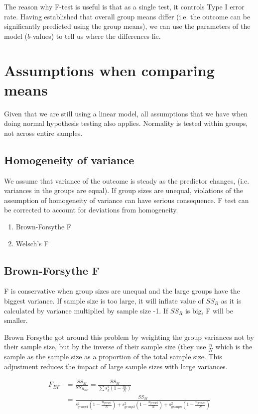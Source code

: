 The reason why F-test is useful is that as a single test, it controls Type I error rate. Having established that overall group means differ (i.e. the outcome can be significantly predicted using the group means), we can use the parameters of the model ($b$-values) to tell us where the differences lie. 

\section{Assumptions when comparing means}
Given that we are still using a linear model, all assumptions that we have when doing normal hypothesis testing also applies. Normality is tested within groups, not across entire samples. 
\subsection{Homogeneity of variance}
We assume that variance of the outcome is steady as the predictor changes, (i.e. variances in the groups are equal). 
If group sizes are unequal, violations of the assumption of homogeneity of variance can have serious consequence. 
F test can be corrected to account for deviations from homogeneity. 
\begin{enumerate}
\item Brown-Forsythe F
\item Welsch's F
\end{enumerate}

\subsection{Brown-Forsythe F}
F is conservative when group sizes are unequal and the large groups have the biggest variance. If sample size is too large, it will inflate value of $SS_R$ as it is calculated by variance multiplied by sample size -1. If $SS_R$ is big, F will be smaller. 

Brown Forsythe got around this problem by weighting the group variances not by their sample size, but by the inverse of their sample size (they use $\frac{n}{N}$ which is the sample as the sample size as a proportion of the total sample size. This adjustment reduces the impact of large sample sizes with large variances.

\begin{equation}
\begin{split}
F_{BF} & = \frac{SS_M}{SS_{R_{BF}}}  =\frac{SS_M}{\sum s^2_k (1-\frac{n_k}{N})}  \\
& = \frac{SS_M}{s^2_{group1}(1-\frac{n_{group1}}{N}) + s^2_{group2}(1-\frac{n_{group2}}{N}) + s^2_{groupn}(1-\frac{n_{groupn}}{N})}
\end{split}
\end{equation}


